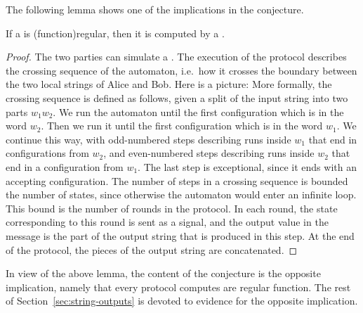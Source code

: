     The following lemma shows one of the implications in the conjecture.

\begin{lemma}\label{lem:from-regular-to-protocol}
    If a  is \kl(function){regular}, 
    then it is computed by a .
\end{lemma}
\begin{proof}
    The two parties can simulate a . The execution
    of the protocol describes the crossing sequence of the automaton, i.e.~how
    it crosses the boundary between the two local strings of Alice and Bob.
    Here is a picture:  More formally, the crossing sequence is
    defined as follows, given  a split of the input string into two parts $w_1
    w_2$. We run the automaton until the first configuration which is in the
    word $w_2$. Then we run it until the first configuration which is in the
    word $w_1$. We continue this way, with odd-numbered steps describing runs
    inside $w_1$ that end in  configurations from $w_2$, and even-numbered
    steps describing runs inside $w_2$ that end in a configuration from $w_1$.
    The last step is exceptional, since it ends with an accepting
    configuration. The number of steps in a crossing sequence is bounded  the
    number of states, since otherwise the automaton would enter an infinite
    loop. This bound is the number of rounds in the protocol. In each round,
    the state corresponding to this round is sent as a signal, and the output
    value in the message is the  part of the output string that is produced in
    this  step. At the end of the protocol, the pieces of the output string are
    concatenated. 
\end{proof}

In view of the above lemma, the content of the conjecture is the opposite
implication, namely that every protocol computes are regular function.  The
rest of Section~\ref{sec:string-outputs} is devoted to  evidence for the
opposite implication.


